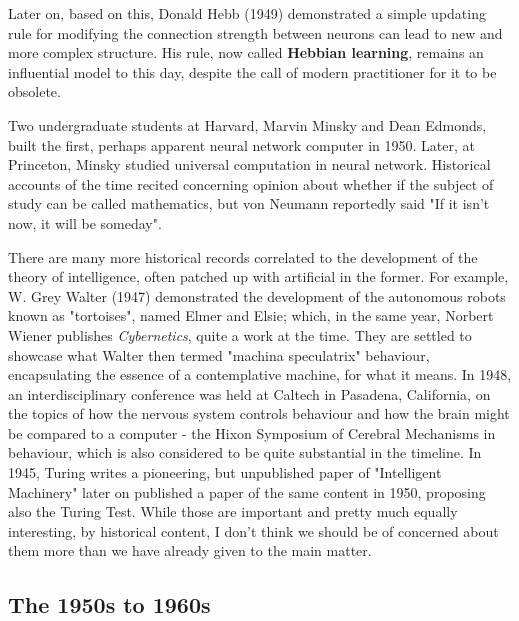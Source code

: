 Later on, based on this, Donald Hebb (1949) demonstrated a simple updating rule for modifying the connection strength between neurons can lead to new and more complex structure. His rule, now called \textbf{Hebbian learning}, remains an influential model to this day, despite the call of modern practitioner for it to be obsolete. 

Two undergraduate students at Harvard, Marvin Minsky and Dean Edmonds, built the first, perhaps apparent neural network computer in 1950. Later, at Princeton, Minsky studied universal computation in neural network. Historical accounts of the time recited concerning opinion about whether if the subject of study can be called mathematics, but von Neumann reportedly said "If it isn't now, it will be someday". 

There are many more historical records correlated to the development of the theory of intelligence, often patched up with artificial in the former. For example, W. Grey Walter (1947) demonstrated the development of the autonomous robots known as "tortoises", named Elmer and Elsie; which, in the same year, Norbert Wiener publishes \textit{Cybernetics}, quite a work at the time. They are settled to showcase what Walter then termed "machina speculatrix" behaviour, encapsulating the essence of a contemplative machine, for what it means. In 1948, an interdisciplinary conference was held at Caltech in Pasadena, California, on the topics of how the nervous system controls behaviour and how the brain might be compared to a computer - the Hixon Symposium of Cerebral Mechanisms in behaviour, which is also considered to be quite substantial in the timeline. In 1945, Turing writes a pioneering, but unpublished paper of "Intelligent Machinery" later on published a paper of the same content in 1950, proposing also the Turing Test. While those are important and pretty much equally interesting, by historical content, I don't think we should be of concerned about them more than we have already given to the main matter. 
\subsection{The 1950s to 1960s}

